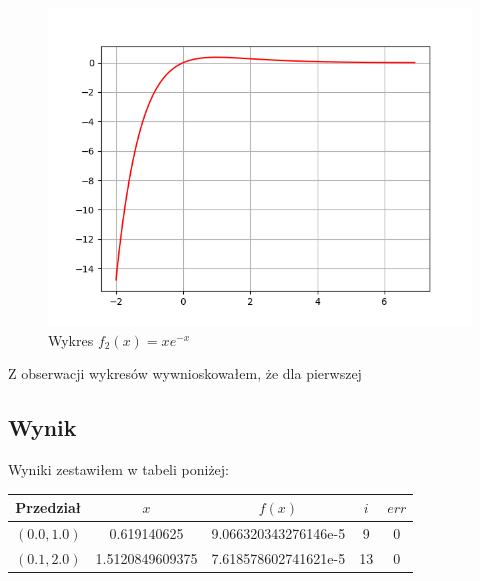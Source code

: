 \begin{figure}[!htbp]
  \centering  
  \includegraphics[totalheight=6cm]{../plots/ex6_f_2.png}
  \caption{Wykres $f_2(x) = xe^{-x}$}
\end{figure}


Z obserwacji wykresów wywnioskowałem, że dla pierwszej 

\subsection{Wynik}
Wyniki zestawiłem w tabeli poniżej: \\
\begin{center}
\begin{tabular}{|c|c|c|c|c|}
  \hline 
    Przedział & $x$ & $ f(x)$ & $i$ & $err$ \\
  \hline
  $ (0.0, 1.0) $ & 0.619140625 & 9.066320343276146e-5 & 9 & 0\\
  \hline 
  $ (0.1, 2.0) $ & 1.5120849609375 & 7.618578602741621e-5 & 13 & 0\\
  \hline
\end{tabular} 
\end{center}
